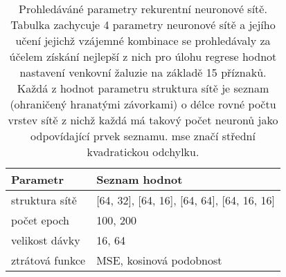 \begin{table}[htbp]
  \centering
    \begin{tabular}{l|l}
    \toprule
    Parametr & Seznam hodnot \\
    \midrule
    \midrule
    struktura sítě & [64, 32], [64, 16], [64, 64], [64, 16, 16] \\
    \midrule
    počet epoch & 100, 200 \\
    \midrule
    velikost dávky & 16, 64 \\
    \midrule
    ztrátová funkce & MSE, kosinová podobnost \\
    \bottomrule
    \bottomrule
    \end{tabular}%
    \caption[Prohledáváné parametry rekurentní neuronové sítě]{Prohledáváné parametry rekurentní neuronové sítě. Tabulka zachycuje 4 parametry neuronové sítě a jejího učení jejichž vzájemné kombinace se prohledávaly za účelem získání nejlepší z nich pro úlohu regrese hodnot nastavení venkovní žaluzie na základě 15 příznaků. Každá z hodnot parametru struktura sítě je seznam (ohraničený hranatými závorkami) o délce rovné počtu vrstev sítě z nichž každá má takový počet neuronů jako odpovídající prvek seznamu. \acrshort{mse} značí střední kvadratickou odchylku.}
  \label{tab:lstmhyper}%
\end{table}%
